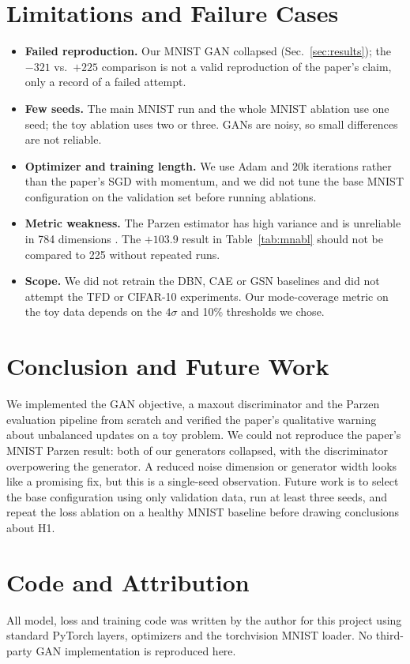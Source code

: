 \documentclass[conference]{IEEEtran}
\begin{document}
\section{Limitations and Failure Cases}
\label{sec:limits}
\begin{itemize}
\item \textbf{Failed reproduction.} Our MNIST GAN collapsed (Sec.~\ref{sec:results}); the $-321$ vs.\ $+225$ comparison is not a valid reproduction of the paper's claim, only a record of a failed attempt.
\item \textbf{Few seeds.} The main MNIST run and the whole MNIST ablation use one seed; the toy ablation uses two or three. GANs are noisy, so small differences are not reliable.
\item \textbf{Optimizer and training length.} We use Adam and 20k iterations rather than the paper's SGD with momentum, and we did not tune the base MNIST configuration on the validation set before running ablations.
\item \textbf{Metric weakness.} The Parzen estimator has high variance and is unreliable in 784 dimensions \cite{goodfellow2014gan,theis2016note}. The $+103.9$ result in Table~\ref{tab:mnabl} should not be compared to 225 without repeated runs.
\item \textbf{Scope.} We did not retrain the DBN, CAE or GSN baselines and did not attempt the TFD or CIFAR-10 experiments. Our mode-coverage metric on the toy data depends on the $4\sigma$ and 10\% thresholds we chose.
\end{itemize}

\section{Conclusion and Future Work}
We implemented the GAN objective, a maxout discriminator and the Parzen evaluation pipeline from scratch and verified the paper's qualitative warning about unbalanced updates on a toy problem. We could not reproduce the paper's MNIST Parzen result: both of our generators collapsed, with the discriminator overpowering the generator. A reduced noise dimension or generator width looks like a promising fix, but this is a single-seed observation. Future work is to select the base configuration using only validation data, run at least three seeds, and repeat the loss ablation on a healthy MNIST baseline before drawing conclusions about H1.

\section*{Code and Attribution}
All model, loss and training code was written by the author for this project using standard PyTorch layers, optimizers and the torchvision MNIST loader. No third-party GAN implementation is reproduced here.



\end{document}
